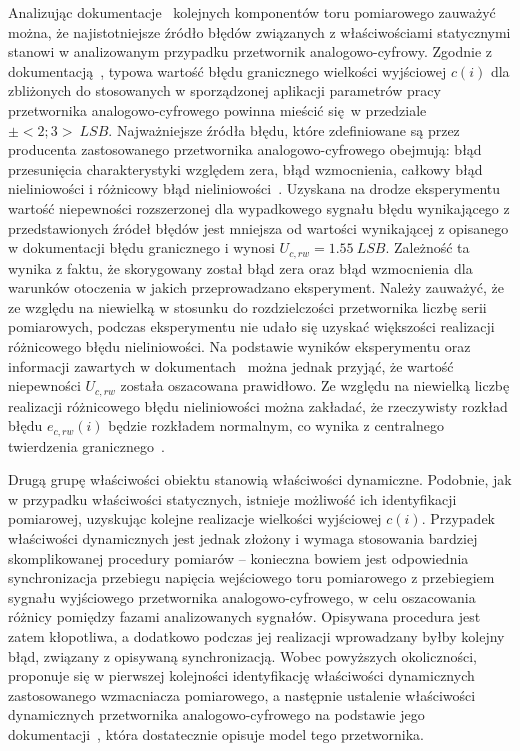 Analizując dokumentacje~\cite{microchip_manual, stm_manual, diodes_manual, stm_f411} kolejnych komponentów toru pomiarowego zauważyć można, że najistotniejsze źródło błędów związanych z właściwościami statycznymi stanowi w analizowanym przypadku przetwornik analogowo-cyfrowy. Zgodnie z dokumentacją~\cite{stm_f411}, typowa wartość błędu granicznego wielkości wyjściowej $c(i)$ dla zbliżonych do stosowanych w sporządzonej aplikacji parametrów pracy przetwornika analogowo-cyfrowego powinna mieścić się w przedziale $\pm<2; 3>~\unit{LSB}$. Najważniejsze źródła błędu, które zdefiniowane są przez producenta zastosowanego przetwornika analogowo-cyfrowego obejmują: błąd przesunięcia charakterystyki względem zera, błąd wzmocnienia, całkowy błąd nieliniowości i różnicowy błąd nieliniowości~\cite{stm_adc, stm_f411}. Uzyskana na drodze eksperymentu wartość niepewności rozszerzonej dla wypadkowego sygnału błędu wynikającego z przedstawionych źródeł błędów jest mniejsza od wartości wynikającej z opisanego w dokumentacji błędu granicznego i wynosi $U_{c,rw} = \qty{1.55}{LSB}$. Zależność ta wynika z faktu, że skorygowany został błąd zera oraz błąd wzmocnienia dla warunków otoczenia w jakich przeprowadzano eksperyment. Należy zauważyć, że ze względu na niewielką w stosunku do rozdzielczości przetwornika liczbę serii pomiarowych, podczas eksperymentu nie udało się uzyskać większości realizacji różnicowego błędu nieliniowości. Na podstawie wyników eksperymentu oraz informacji zawartych w dokumentach~\cite{stm_f411, stm_adc} można jednak przyjąć, że wartość niepewności $U_{c,rw}$ została oszacowana prawidłowo. Ze względu na niewielką liczbę realizacji różnicowego błędu nieliniowości można zakładać, że rzeczywisty rozkład błędu $e_{c,rw}(i)$ będzie rozkładem normalnym, co wynika z centralnego twierdzenia granicznego~\cite{jcgm_guide}.

Drugą grupę właściwości obiektu stanowią właściwości dynamiczne. Podobnie, jak w przypadku właściwości statycznych, istnieje możliwość ich identyfikacji pomiarowej, uzyskując kolejne realizacje wielkości wyjściowej $c(i)$. Przypadek właściwości dynamicznych jest jednak złożony i wymaga stosowania bardziej skomplikowanej procedury pomiarów -- konieczna bowiem jest odpowiednia synchronizacja przebiegu napięcia wejściowego toru pomiarowego z przebiegiem sygnału wyjściowego przetwornika analogowo-cyfrowego, w celu oszacowania różnicy pomiędzy fazami analizowanych sygnałów. Opisywana procedura jest zatem kłopotliwa, a dodatkowo podczas jej realizacji wprowadzany byłby kolejny błąd, związany z opisywaną synchronizacją. Wobec powyższych okoliczności, proponuje się w pierwszej kolejności identyfikację właściwości dynamicznych zastosowanego wzmacniacza pomiarowego, a następnie ustalenie właściwości dynamicznych przetwornika analogowo-cyfrowego na podstawie jego dokumentacji~\cite{stm_f411}, która dostatecznie opisuje model tego przetwornika.

